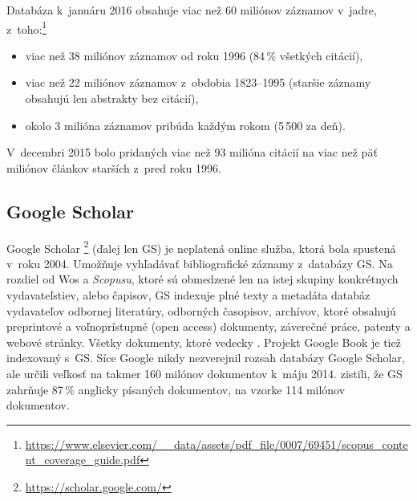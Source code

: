 Databáza k~januáru 2016 obsahuje viac než 60 miliónov záznamov v~jadre, z~toho:\footnote{\url{https://www.elsevier.com/__data/assets/pdf_file/0007/69451/scopus_content_coverage_guide.pdf}}

\begin{itemize}
  \item viac než 38 miliónov záznamov od roku 1996 (84\,\% všetkých citácií),
  \item viac než 22 miliónov záznamov z~obdobia 1823--1995 (staršie záznamy
    obsahujú len abstrakty bez citácií),
  \item okolo 3 milióna záznamov pribúda každým rokom (5\,500 za deň).
\end{itemize}

V~decembri 2015 bolo pridaných viac než 93 milióna citácií na viac než päť
miliónov článkov starších z~pred roku
1996.

\subsection{Google Scholar}
\label{sec:gs}

Google Scholar \footnote{\url{https://scholar.google.com/}} (ďalej len GS) je neplatená online
služba, ktorá bola spustená v~roku 2004.  Umožňuje vyhľadávať bibliografické
záznamy z~databázy GS. Na rozdiel od Wos a \emph{Scopusu}, ktoré sú obmedzené
len na istej skupiny konkrétnych vydavateľstiev, alebo čapisov, GS indexuje
plné texty a metadáta databáz vydavateľov odbornej literatúry, odborných
časopisov, archívov, ktoré obsahujú preprintové a voľnoprístupné (open access)
dokumenty, záverečné práce, patenty a webové stránky. Všetky dokumenty, ktoré
 vedecky \citep{Vine2006}.  Projekt Google Book je tiež indexovaný
s~GS.  Síce Google nikdy nezverejnil rozsah databázy Google Scholar, ale
\citet{Orduna-Malea2015} určili veľkosť na takmer 160 milónov dokumentov k~máju
2014. \citet{Khabsa2014} zistili, že GS zahrňuje 87\,\% anglicky písaných
dokumentov, na vzorke 114 milónov dokumentov.

